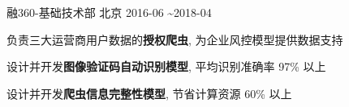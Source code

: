 \begin{cventries}
	
	{融360-基础技术部} %
	{北京} %
	{2016-06 \textasciitilde 2018-04} %
	{ %
		\begin{cvitems}
			\item {负责三大运营商用户数据的\textbf{授权爬虫}, 为企业风控模型提供数据支持}
			\item {设计并开发\textbf{图像验证码自动识别模型}, 平均识别准确率 97\% 以上}
			\item {设计并开发\textbf{爬虫信息完整性模型}, 节省计算资源 60\% 以上}
		\end{cvitems} 
	}
	
	
\end{cventries}
